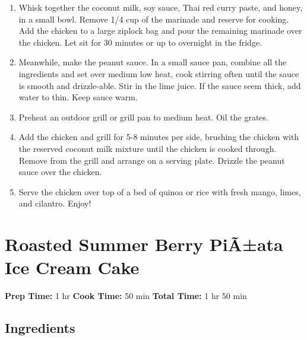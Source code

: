 \documentclass[
  letterpaper,
  DIV=11,
  numbers=noendperiod,
  titlepage=false]{scrreprt}
\providecommand{\tightlist}{%
  \setlength{\itemsep}{0pt}\setlength{\parskip}{0pt}}\usepackage{longtable,booktabs,array}
\begin{document}
\begin{enumerate}
\def\labelenumi{\arabic{enumi}.}
\tightlist
\item
  Whisk together the coconut milk, soy sauce, Thai red curry paste, and
  honey, in a small bowl. Remove 1/4 cup of the marinade and reserve for
  cooking. Add the chicken to a large ziplock bag and pour the remaining
  marinade over the chicken. Let sit for 30 minutes or up to overnight
  in the fridge.
\item
  Meanwhile, make the peanut sauce. In a small sauce pan, combine all
  the ingredients and set over medium low heat, cook stirring often
  until the sauce is smooth and drizzle-able. Stir in the lime juice. If
  the sauce seem thick, add water to thin. Keep sauce warm.
\item
  Preheat an outdoor grill or grill pan to medium heat. Oil the grates.
\item
  Add the chicken and grill for 5-8 minutes per side, brushing the
  chicken with the reserved coconut milk mixture until the chicken is
  cooked through. Remove from the grill and arrange on a serving plate.
  Drizzle the peanut sauce over the chicken.
\item
  Serve the chicken over top of a bed of quinoa or rice with fresh
  mango, limes, and cilantro. Enjoy!
\end{enumerate}


\chapter{Roasted Summer Berry PiÃ±ata Ice Cream
Cake}\label{roasted-summer-berry-piuxe3ata-ice-cream-cake}

\textbf{Prep Time:} 1 hr \textbar{} \textbf{Cook Time:} 50 min
\textbar{} \textbf{Total Time:} 1 hr 50 min

\section{Ingredients}\label{ingredients-83}
\end{document}
